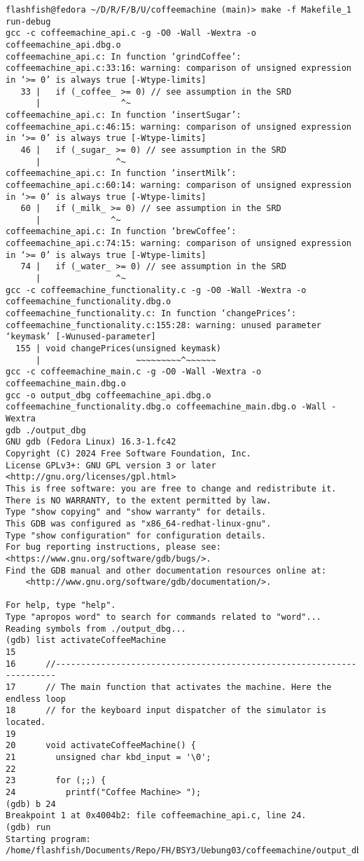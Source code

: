 \documentclass{report}
\begin{document}
\begin{lstlisting}[style=cppstyle, title=\texttt{Terminal Output}]
flashfish@fedora ~/D/R/F/B/U/coffeemachine (main)> make -f Makefile_1 run-debug
gcc -c coffeemachine_api.c -g -O0 -Wall -Wextra -o coffeemachine_api.dbg.o
coffeemachine_api.c: In function ‘grindCoffee’:
coffeemachine_api.c:33:16: warning: comparison of unsigned expression in ‘>= 0’ is always true [-Wtype-limits]
   33 |   if (_coffee_ >= 0) // see assumption in the SRD
      |                ^~
coffeemachine_api.c: In function ‘insertSugar’:
coffeemachine_api.c:46:15: warning: comparison of unsigned expression in ‘>= 0’ is always true [-Wtype-limits]
   46 |   if (_sugar_ >= 0) // see assumption in the SRD
      |               ^~
coffeemachine_api.c: In function ‘insertMilk’:
coffeemachine_api.c:60:14: warning: comparison of unsigned expression in ‘>= 0’ is always true [-Wtype-limits]
   60 |   if (_milk_ >= 0) // see assumption in the SRD
      |              ^~
coffeemachine_api.c: In function ‘brewCoffee’:
coffeemachine_api.c:74:15: warning: comparison of unsigned expression in ‘>= 0’ is always true [-Wtype-limits]
   74 |   if (_water_ >= 0) // see assumption in the SRD
      |               ^~
gcc -c coffeemachine_functionality.c -g -O0 -Wall -Wextra -o coffeemachine_functionality.dbg.o
coffeemachine_functionality.c: In function ‘changePrices’:
coffeemachine_functionality.c:155:28: warning: unused parameter ‘keymask’ [-Wunused-parameter]
  155 | void changePrices(unsigned keymask)
      |                   ~~~~~~~~~^~~~~~~
gcc -c coffeemachine_main.c -g -O0 -Wall -Wextra -o coffeemachine_main.dbg.o
gcc -o output_dbg coffeemachine_api.dbg.o coffeemachine_functionality.dbg.o coffeemachine_main.dbg.o -Wall -Wextra
gdb ./output_dbg
GNU gdb (Fedora Linux) 16.3-1.fc42
Copyright (C) 2024 Free Software Foundation, Inc.
License GPLv3+: GNU GPL version 3 or later <http://gnu.org/licenses/gpl.html>
This is free software: you are free to change and redistribute it.
There is NO WARRANTY, to the extent permitted by law.
Type "show copying" and "show warranty" for details.
This GDB was configured as "x86_64-redhat-linux-gnu".
Type "show configuration" for configuration details.
For bug reporting instructions, please see:
<https://www.gnu.org/software/gdb/bugs/>.
Find the GDB manual and other documentation resources online at:
    <http://www.gnu.org/software/gdb/documentation/>.

For help, type "help".
Type "apropos word" to search for commands related to "word"...
Reading symbols from ./output_dbg...
(gdb) list activateCoffeeMachine
15
16      //----------------------------------------------------------------------
17      // The main function that activates the machine. Here the endless loop
18      // for the keyboard input dispatcher of the simulator is located.
19
20      void activateCoffeeMachine() {
21        unsigned char kbd_input = '\0';
22
23        for (;;) {
24          printf("Coffee Machine> ");
(gdb) b 24
Breakpoint 1 at 0x4004b2: file coffeemachine_api.c, line 24.
(gdb) run
Starting program: /home/flashfish/Documents/Repo/FH/BSY3/Uebung03/coffeemachine/output_dbg


\end{lstlisting}
\end{document}

